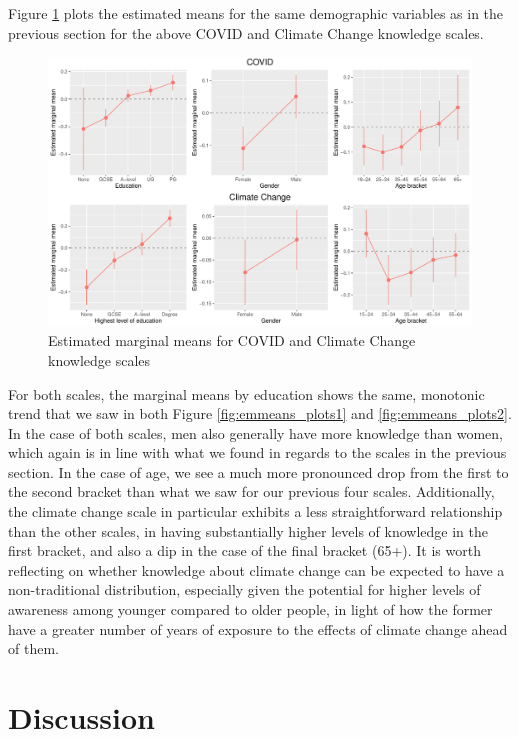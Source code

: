 \documentclass[12pt,halfline,a4paper,]{ouparticle}
\begin{document}
Figure \ref{fig:emmeans_plots4} plots the estimated means for the same
demographic variables as in the previous section for the above COVID and
Climate Change knowledge scales.

\begin{figure}[!h]
\includegraphics[width=1\linewidth]{Revisiting-the-Measurement-and-Dimensionality-of-Political-Knowledge--Evidence-from-Seven-European-Countries_files/figure-latex/emmeans_plots4-1} \caption{Estimated marginal means for COVID and Climate Change knowledge scales}\label{fig:emmeans_plots4}
\end{figure}

For both scales, the marginal means by education shows the same,
monotonic trend that we saw in both Figure \ref{fig:emmeans_plots1} and
\ref{fig:emmeans_plots2}. In the case of both scales, men also generally
have more knowledge than women, which again is in line with what we
found in regards to the scales in the previous section. In the case of
age, we see a much more pronounced drop from the first to the second
bracket than what we saw for our previous four scales. Additionally, the
climate change scale in particular exhibits a less straightforward
relationship than the other scales, in having substantially higher
levels of knowledge in the first bracket, and also a dip in the case of
the final bracket (65+). It is worth reflecting on whether knowledge
about climate change can be expected to have a non-traditional
distribution, especially given the potential for higher levels of
awareness among younger compared to older people, in light of how the
former have a greater number of years of exposure to the effects of
climate change ahead of them.

\hypertarget{discussion}{%
\section{Discussion}\label{discussion}}
\end{document}
